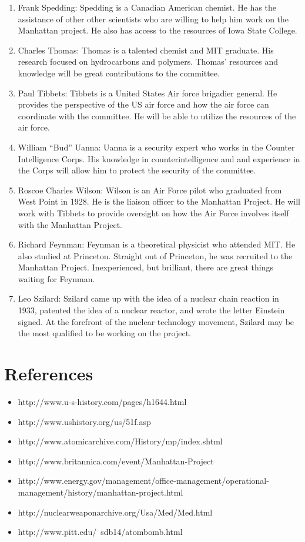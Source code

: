\documentclass[11 pt, twoside]{article}
\begin{document}
\begin{enumerate}
\item Frank Spedding: Spedding is a Canadian American chemist. He has the assistance of other other scientists who are willing to help him work on the Manhattan project. He also has access to the resources of Iowa State College.
\item Charles Thomas: Thomas is a talented chemist and MIT graduate. His research focused on hydrocarbons and polymers. Thomas’ resources and knowledge will be great contributions to the committee. 
\item Paul Tibbets: Tibbets is a United States Air force brigadier general. He provides the perspective of the US air force and how the air force can coordinate with the committee. He will be able to utilize the resources of the air force.
\item William “Bud” Uanna: Uanna is a security expert who works in the Counter Intelligence Corps. His knowledge in counterintelligence and and experience in the Corps will allow him to protect the security of the committee.
\item Roscoe Charles Wilson: Wilson is an Air Force pilot who graduated from West Point in 1928. He is the liaison officer to the Manhattan Project. He will work with Tibbets to provide oversight on how the Air Force involves itself with the Manhattan Project. 
\item Richard Feynman: Feynman is a theoretical physicist who attended MIT. He also studied at   Princeton. Straight out of Princeton, he was recruited to the Manhattan Project. Inexperienced, but brilliant, there are great things waiting for Feynman. 
\item Leo Szilard: Szilard came up with the idea of a nuclear chain reaction in 1933, patented the idea of a nuclear reactor, and wrote the letter Einstein signed. At the forefront of the nuclear technology movement, Szilard may be the most qualified to be working on the project.
\end{enumerate}

\section{References}
\begin{itemize}
\item http://www.u-s-history.com/pages/h1644.html 
\item http://www.ushistory.org/us/51f.asp 
\item http://www.atomicarchive.com/History/mp/index.shtml 
\item http://www.britannica.com/event/Manhattan-Project 
\item http://www.energy.gov/management/office-management/operational-management/history/manhattan-project.html
\item http://nuclearweaponarchive.org/Usa/Med/Med.html 
\item http://www.pitt.edu/~sdb14/atombomb.html 
\end{itemize}
\end{document}
